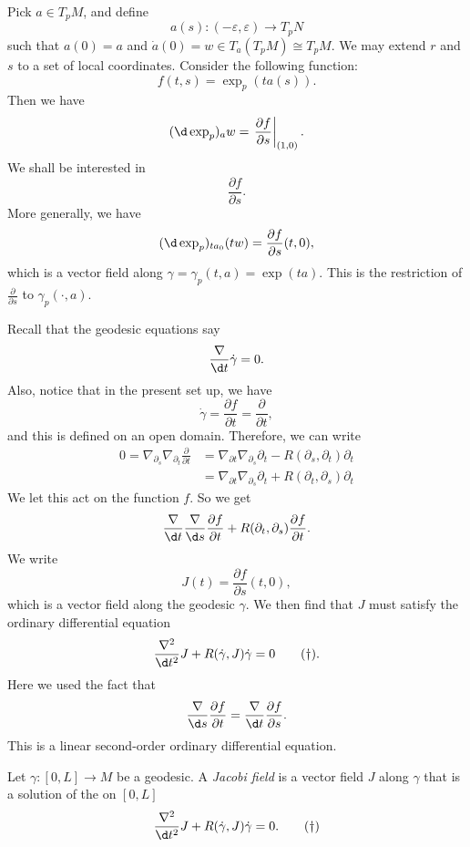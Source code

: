 \documentclass[a4paper]{article}
\begin{document}
Pick $a \in T_p M$, and define
\[
  a(s): (-\varepsilon, \varepsilon) \to T_p N
\]
such that $a(0) = a$ and $\dot{a}(0) = w \in T_a(T_p M) \cong T_p M$. We may extend $r$ and $s$ to a set of local coordinates. Consider the following function:
\[
  f(t, s) = \exp_p(t a(s)).
\]
Then we have
\[
  (\d \exp_p)_a w = \left.\frac{\partial f}{\partial s}\right|_{(1, 0)}.
\]
We shall be interested in
\[
  \frac{\partial f}{\partial s}.
\]
More generally, we have
\[
  (\d \exp_p)_{t a_0} (tw) = \frac{\partial f}{\partial s}(t, 0),
\]
which is a vector field along $\gamma = \gamma_p(t, a) = \exp(ta)$. This is the restriction of $\frac{\partial}{\partial s}$ to $\gamma_p(\cdot, a)$.

Recall that the geodesic equations say
\[
  \frac{\nabla}{\d t} \dot{\gamma} = 0.
\]
Also, notice that in the present set up, we have
\[
  \dot{\gamma} = \frac{\partial f}{\partial t} = \frac{\partial}{\partial t},
\]
and this is defined on an open domain. Therefore, we can write
\begin{align*}
  0 = \nabla_{\partial_s} \nabla_{\partial_t} \frac{\partial}{\partial t} &= \nabla_{\partial t} \nabla_{\partial_s} \partial_t - R(\partial_s, \partial_t) \partial_t\\
  &= \nabla_{\partial t} \nabla_{\partial_s} \partial_t + R(\partial_t, \partial_s) \partial_t
\end{align*}
We let this act on the function $f$. So we get
\[
  \frac{\nabla}{\d t} \frac{\nabla}{\d s} \frac{\partial f}{\partial t} + R(\partial_t, \partial_s) \frac{\partial f}{\partial t}.
\]
We write
\[
  J(t) = \frac{\partial f}{\partial s}(t, 0),
\]
which is a vector field along the geodesic $\gamma$. We then find that $J$ must satisfy the ordinary differential equation
\[
  \frac{\nabla^2}{\d t^2} J + R(\dot{\gamma}, J) \dot{\gamma} = 0 \tag{$\dagger$}.
\]
Here we used the fact that
\[
  \frac{\nabla}{\d s} \frac{\partial f}{\partial t} = \frac{\nabla}{\d t} \frac{\partial f}{\partial s}.
\]
This is a linear second-order ordinary differential equation.

\begin{defi}
  Let $\gamma: [0, L] \to M$ be a geodesic. A \emph{Jacobi field} is a vector field $J$ along $\gamma$ that is a solution of the  on $[0, L]$
  \[
    \frac{\nabla^2}{\d t^2} J + R(\dot{\gamma}, J) \dot{\gamma} = 0. \tag{$\dagger$}
  \]
\end{defi}
\end{document}
